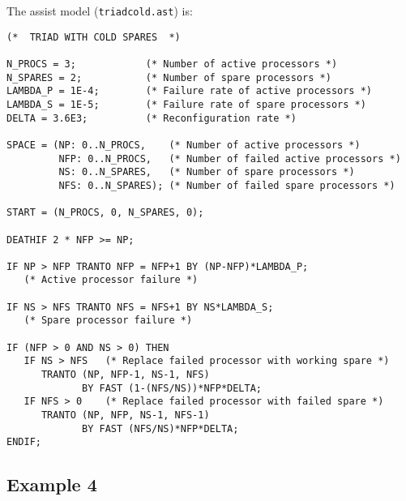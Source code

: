The assist model (\verb|triadcold.ast|) is:
\begin{verbatim}
(*  TRIAD WITH COLD SPARES  *)

N_PROCS = 3;            (* Number of active processors *)
N_SPARES = 2;           (* Number of spare processors *)
LAMBDA_P = 1E-4;        (* Failure rate of active processors *)
LAMBDA_S = 1E-5;        (* Failure rate of spare processors *)
DELTA = 3.6E3;          (* Reconfiguration rate *)

SPACE = (NP: 0..N_PROCS,	(* Number of active processors *)
         NFP: 0..N_PROCS,	(* Number of failed active processors *)
         NS: 0..N_SPARES,	(* Number of spare processors *)
         NFS: 0..N_SPARES);	(* Number of failed spare processors *)

START = (N_PROCS, 0, N_SPARES, 0);

DEATHIF 2 * NFP >= NP;

IF NP > NFP TRANTO NFP = NFP+1 BY (NP-NFP)*LAMBDA_P;  
   (* Active processor failure *)

IF NS > NFS TRANTO NFS = NFS+1 BY NS*LAMBDA_S;       
   (* Spare processor failure *)

IF (NFP > 0 AND NS > 0) THEN
   IF NS > NFS   (* Replace failed processor with working spare *)
      TRANTO (NP, NFP-1, NS-1, NFS)
             BY FAST (1-(NFS/NS))*NFP*DELTA;
   IF NFS > 0    (* Replace failed processor with failed spare *)
      TRANTO (NP, NFP, NS-1, NFS-1)
             BY FAST (NFS/NS)*NFP*DELTA;    
ENDIF;
\end{verbatim}


\subsection{Example 4 }

